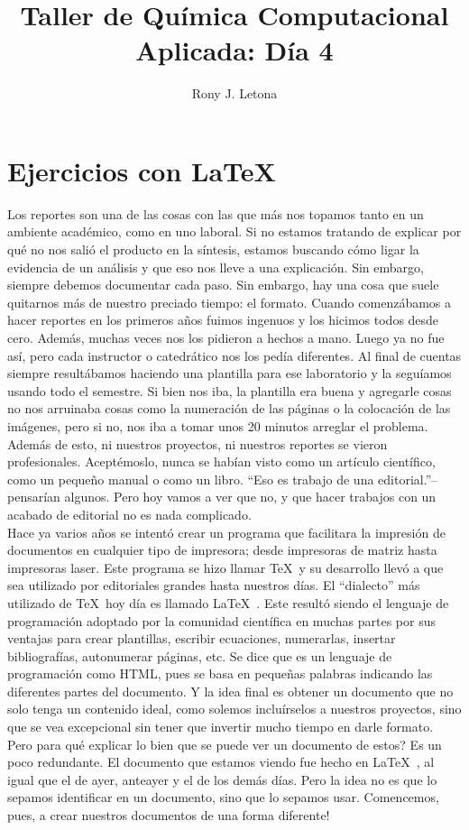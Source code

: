 \documentclass[10pt,letterpaper]{article}
\author{Rony J. Letona}
\title{Taller de Qu\'imica Computacional Aplicada: D\'ia 4}
\begin{document}
\maketitle

\section{Ejercicios con \LaTeX\ }
Los reportes son una de las cosas con las que m\'as nos topamos tanto en un ambiente acad\'emico, como en uno laboral. Si no estamos tratando de explicar por qu\'e no nos sali\'o el producto en la s\'intesis, estamos buscando c\'omo ligar la evidencia de un an\'alisis y que eso nos lleve a una explicaci\'on. Sin embargo, siempre debemos documentar cada paso. Sin embargo, hay una cosa que suele quitarnos m\'as de nuestro preciado tiempo: el formato. Cuando comenz\'abamos a hacer reportes en los primeros a\~nos fuimos ingenuos y los hicimos todos desde cero. Adem\'as, muchas veces nos los pidieron a hechos a mano. Luego ya no fue as\'i, pero cada instructor o catedr\'atico nos los ped\'ia diferentes. Al final de cuentas siempre result\'abamos haciendo una plantilla para ese laboratorio y la segu\'iamos usando todo el semestre. Si bien nos iba, la plantilla era buena y agregarle cosas no nos arruinaba cosas como la numeraci\'on de las p\'aginas o la colocaci\'on de las im\'agenes, pero si no, nos iba a tomar unos 20 minutos arreglar el problema. Adem\'as de esto, ni nuestros proyectos, ni nuestros reportes se vieron profesionales. Acept\'emoslo, nunca se hab\'ian visto como un art\'iculo cient\'ifico, como un peque\~no manual o como un libro. ``Eso es trabajo de una editorial.''--pensar\'ian algunos. Pero hoy vamos a ver que no, y que hacer trabajos con un acabado de editorial no es nada complicado.\\

Hace ya varios a\~nos se intent\'o crear un programa que facilitara la impresi\'on de documentos en cualquier tipo de impresora; desde impresoras de matriz hasta impresoras laser. Este programa se hizo llamar \TeX\ y su desarrollo llev\'o a que sea utilizado por editoriales grandes hasta nuestros d\'ias. El ``dialecto'' m\'as utilizado de \TeX\ hoy d\'ia es llamado \LaTeX\ . Este result\'o siendo el lenguaje de programaci\'on adoptado por la comunidad cient\'ifica en muchas partes por sus ventajas para crear plantillas, escribir ecuaciones, numerarlas, insertar bibliograf\'ias, autonumerar p\'aginas, etc. Se dice que es un lenguaje de programaci\'on como HTML, pues se basa en peque\~nas palabras indicando las diferentes partes del documento. Y la idea final es obtener un documento que no solo tenga un contenido ideal, como solemos inclu\'irselos a nuestros proyectos, sino que se vea excepcional sin tener que invertir mucho tiempo en darle formato. Pero para qu\'e explicar lo bien que se puede ver un documento de estos? Es un poco redundante. El documento que estamos viendo fue hecho en \LaTeX\ , al igual que el de ayer, anteayer y el de los dem\'as d\'ias. Pero la idea no es que lo sepamos identificar en un documento, sino que lo sepamos usar. Comencemos, pues, a crear nuestros documentos de una forma diferente!
\end{document}
